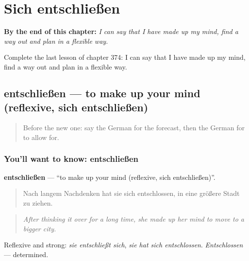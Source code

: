 
\chapter{Sich entschließen}
\label{ch:ge-sich-entschlie-en}

\begin{chapteropening}
\textbf{By the end of this chapter:} \emph{I can say that I have made up my mind, find a way out and plan in a flexible way.}

Complete the last lesson of chapter 374: I can say that I have made up my mind, find a way out and plan in a flexible way.
\end{chapteropening}

\section[entschließen]{entschließen — to make up your mind (reflexive, sich entschließen)}

\label{lesson:GE-C374-entschliessen}



\begin{quote}
Before the new one: say the German for the forecast, then the German for to allow for.
\end{quote}

\subsection*{You'll want to know: entschließen}
\textbf{entschließen} — \textquotedblleft{}to make up your mind (reflexive, sich entschließen)\textquotedblright{}.

\begin{quote}
Nach langem Nachdenken hat sie sich entschlossen, in eine größere Stadt zu ziehen.
\end{quote}

\begin{quote}
\emph{After thinking it over for a long time, she made up her mind to move to a bigger city.}
\end{quote}

Reflexive and strong: \emph{sie entschließt sich}, \emph{sie hat sich entschlossen}. \emph{Entschlossen} — determined.

